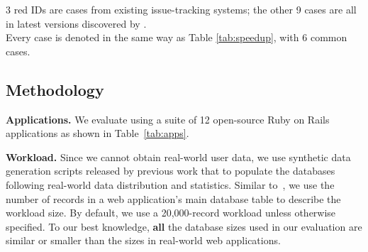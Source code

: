 \begin{table*}[th]
\centering
\caption{Database sizes and page load time of 12 user-study cases}
\label{tab:dbsize}	

\footnotesize{3 red IDs are cases from existing issue-tracking systems; the other 9 cases are all in latest versions discovered by \Tool.\\ Every case is denoted in the same way as Table \ref{tab:speedup}, with 6 common cases.} 
 \vspace{-0.2in}
\end{table*}
\subsection{Methodology}
{\bf Applications.}
We evaluate \Tool using a suite of 12 open-source Ruby on Rails applications as shown in Table~\ref{tab:apps}.

{\bf Workload.} Since we cannot obtain real-world user data, we use synthetic data generation
scripts released by previous work that to populate the databases following real-world
data distribution and statistics.
Similar to~\cite{yang:icse18:hloop},
we use the number of records in a web application's
main database table to describe the workload size. By default, we use a 20,000-record workload
unless otherwise specified.
To our best knowledge, {\bf all} the database sizes used in our evaluation
are similar or smaller than the sizes in real-world web applications.%

